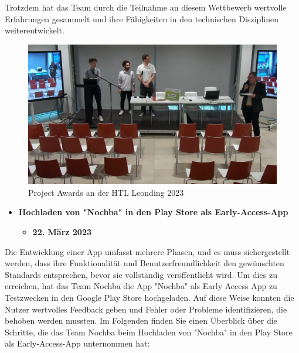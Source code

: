 Trotzdem hat das Team durch die Teilnahme an diesem Wettbewerb wertvolle Erfahrungen gesammelt und ihre Fähigkeiten in den technischen Disziplinen weiterentwickelt.

\begin{figure}[H]
    \centering
    \includegraphics[width=1\textwidth]{pics/ProjectAward.png}
    \caption{Project Awards an der HTL Leonding 2023}
    \label{fig:ProjectAward}
\end{figure}

\begin{itemize}
    \item \textbf{Hochladen von "Nochba" in den Play Store als Early-Access-App}
          \begin{itemize}
              \item \textbf{22. März 2023}
          \end{itemize}
\end{itemize}

Die Entwicklung einer App umfasst mehrere Phasen, und es muss sichergestellt werden, dass ihre Funktionalität und Benutzerfreundlichkeit den gewünschten Standards entsprechen, bevor sie vollständig veröffentlicht wird. Um dies zu erreichen, hat das Team Nochba die App "Nochba" als Early Access App zu Testzwecken in den Google Play Store hochgeladen. Auf diese Weise konnten die Nutzer wertvolles Feedback geben und Fehler oder Probleme identifizieren, die behoben werden mussten. Im Folgenden finden Sie einen Überblick über die Schritte, die das Team Nochba beim Hochladen von "Nochba" in den Play Store als Early-Access-App unternommen hat:


